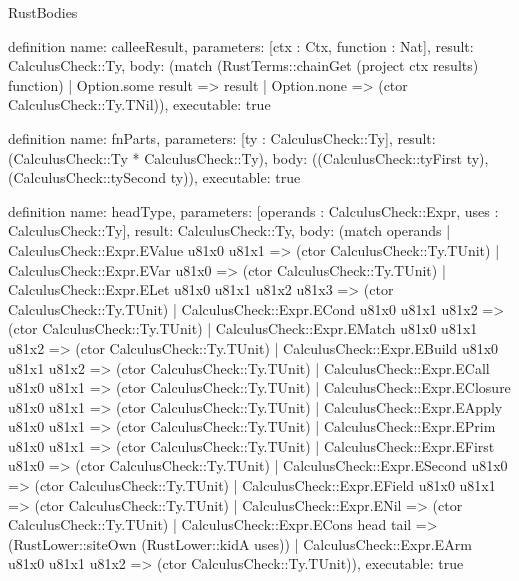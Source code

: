 \begin{lexlean}{RustBodies}
\begin{semanticmodule}
definition{
  name: calleeResult,
  parameters: [ctx : Ctx, function : Nat],
  result: CalculusCheck::Ty,
  body: (match (RustTerms::chainGet (project ctx results) function)
    | Option.some result => result
    | Option.none => (ctor CalculusCheck::Ty.TNil)),
  executable: true
}

definition{
  name: fnParts,
  parameters: [ty : CalculusCheck::Ty],
  result: (CalculusCheck::Ty * CalculusCheck::Ty),
  body: ((CalculusCheck::tyFirst ty), (CalculusCheck::tySecond ty)),
  executable: true
}

definition{
  name: headType,
  parameters: [operands : CalculusCheck::Expr, uses : CalculusCheck::Ty],
  result: CalculusCheck::Ty,
  body: (match operands
    | CalculusCheck::Expr.EValue u81x0 u81x1 => (ctor CalculusCheck::Ty.TUnit)
    | CalculusCheck::Expr.EVar u81x0 => (ctor CalculusCheck::Ty.TUnit)
    | CalculusCheck::Expr.ELet u81x0 u81x1 u81x2 u81x3 => (ctor CalculusCheck::Ty.TUnit)
    | CalculusCheck::Expr.ECond u81x0 u81x1 u81x2 => (ctor CalculusCheck::Ty.TUnit)
    | CalculusCheck::Expr.EMatch u81x0 u81x1 u81x2 => (ctor CalculusCheck::Ty.TUnit)
    | CalculusCheck::Expr.EBuild u81x0 u81x1 u81x2 => (ctor CalculusCheck::Ty.TUnit)
    | CalculusCheck::Expr.ECall u81x0 u81x1 => (ctor CalculusCheck::Ty.TUnit)
    | CalculusCheck::Expr.EClosure u81x0 u81x1 => (ctor CalculusCheck::Ty.TUnit)
    | CalculusCheck::Expr.EApply u81x0 u81x1 => (ctor CalculusCheck::Ty.TUnit)
    | CalculusCheck::Expr.EPrim u81x0 u81x1 => (ctor CalculusCheck::Ty.TUnit)
    | CalculusCheck::Expr.EFirst u81x0 => (ctor CalculusCheck::Ty.TUnit)
    | CalculusCheck::Expr.ESecond u81x0 => (ctor CalculusCheck::Ty.TUnit)
    | CalculusCheck::Expr.EField u81x0 u81x1 => (ctor CalculusCheck::Ty.TUnit)
    | CalculusCheck::Expr.ENil => (ctor CalculusCheck::Ty.TUnit)
    | CalculusCheck::Expr.ECons head tail => (RustLower::siteOwn (RustLower::kidA uses))
    | CalculusCheck::Expr.EArm u81x0 u81x1 u81x2 => (ctor CalculusCheck::Ty.TUnit)),
  executable: true
}


\end{semanticmodule}
\end{lexlean}
